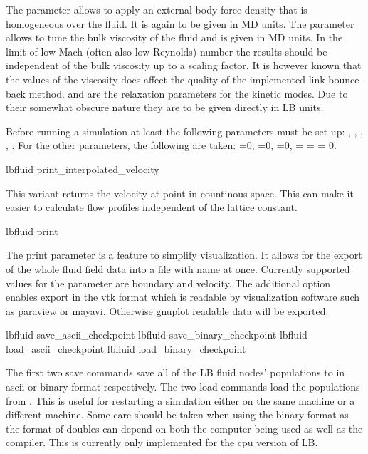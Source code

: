 The parameter  allows to apply an external body force
density that is homogeneous over the fluid. It is again to be given in
MD units.  The parameter  allows to tune the bulk
viscosity of the fluid and is given in MD units. In the limit of low
Mach (often also low Reynolds) number the results should be
independent of the bulk viscosity up to a scaling factor. 
It is however known that the values of the viscosity does 
affect the quality of the implemented link-bounce-back method.
 and
 are the relaxation parameters for the kinetic
modes. Due to their somewhat obscure nature they are to be given
directly in LB units.

Before running a simulation at least the following parameters must be
set up: , , , ,
. For the other parameters, the following are taken:
=0, =0, =0,
 =  =  = 0.

\begin{essyntax}
  lbfluid print_interpolated_velocity   
\end{essyntax}
This variant returns the velocity at point in countinous space. 
This can make it easier to calculate flow profiles independent of
the lattice constant.

\begin{essyntax}
  lbfluid print   
\end{essyntax}
The print parameter is a feature to simplify visualization. It allows for the 
export of the whole fluid field data into a file with name  at 
once. Currently supported values for the parameter  are boundary 
and velocity. The additional option  enables export in the vtk format 
which is readable by visualization software such as paraview or mayavi. 
Otherwise gnuplot readable data will be exported.

\begin{essyntax}
  lbfluid save_ascii_checkpoint 
  lbfluid save_binary_checkpoint 
  lbfluid load_ascii_checkpoint 
  lbfluid load_binary_checkpoint 
\end{essyntax}
The first two save commands save all of the LB fluid nodes' populations to  in ascii or binary format respectively.
The two load commands load the populations from .  This is  useful for restarting a simulation either on the same
machine or a different machine.  Some care should be taken when using the binary format as the format of doubles can depend
on both the computer being used as well as the compiler.  This is currently  only implemented for the cpu version of LB.

